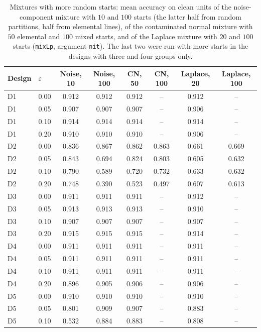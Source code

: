 \begin{table}[htbp]
\centering
\small
\caption{Mixtures with more random starts: mean accuracy on clean units of the noise-component mixture with $10$ and $100$ starts (the latter half from random partitions, half from elemental lines), of the contaminated normal mixture with $50$ elemental and $100$ mixed starts, and of the Laplace mixture with $20$ and $100$ starts (\texttt{mixLp}, argument \texttt{nit}). The last two were run with more starts in the designs with three and four groups only.}
\label{tab:S21}
\begin{tabular}{llcccccc}
\toprule
Design & $\varepsilon$ & Noise, 10 & Noise, 100 & CN, 50 & CN, 100 & Laplace, 20 & Laplace, 100 \\
\midrule
D1 & 0.00 & 0.912 & 0.912 & 0.912 & -- & 0.912 & -- \\
D1 & 0.05 & 0.907 & 0.907 & 0.907 & -- & 0.906 & -- \\
D1 & 0.10 & 0.914 & 0.914 & 0.914 & -- & 0.914 & -- \\
D1 & 0.20 & 0.910 & 0.910 & 0.910 & -- & 0.906 & -- \\
D2 & 0.00 & 0.836 & 0.867 & 0.862 & 0.863 & 0.661 & 0.669 \\
D2 & 0.05 & 0.843 & 0.694 & 0.824 & 0.803 & 0.605 & 0.632 \\
D2 & 0.10 & 0.790 & 0.589 & 0.720 & 0.732 & 0.633 & 0.632 \\
D2 & 0.20 & 0.748 & 0.390 & 0.523 & 0.497 & 0.607 & 0.613 \\
D3 & 0.00 & 0.911 & 0.911 & 0.911 & -- & 0.912 & -- \\
D3 & 0.05 & 0.913 & 0.913 & 0.913 & -- & 0.910 & -- \\
D3 & 0.10 & 0.907 & 0.907 & 0.907 & -- & 0.907 & -- \\
D3 & 0.20 & 0.915 & 0.915 & 0.915 & -- & 0.914 & -- \\
D4 & 0.00 & 0.911 & 0.911 & 0.911 & -- & 0.911 & -- \\
D4 & 0.05 & 0.911 & 0.911 & 0.911 & -- & 0.911 & -- \\
D4 & 0.10 & 0.911 & 0.911 & 0.911 & -- & 0.911 & -- \\
D4 & 0.20 & 0.896 & 0.905 & 0.906 & -- & 0.906 & -- \\
D5 & 0.00 & 0.910 & 0.910 & 0.910 & -- & 0.910 & -- \\
D5 & 0.05 & 0.801 & 0.909 & 0.907 & -- & 0.883 & -- \\
D5 & 0.10 & 0.532 & 0.884 & 0.883 & -- & 0.808 & -- \\

\end{tabular}
\end{table}

